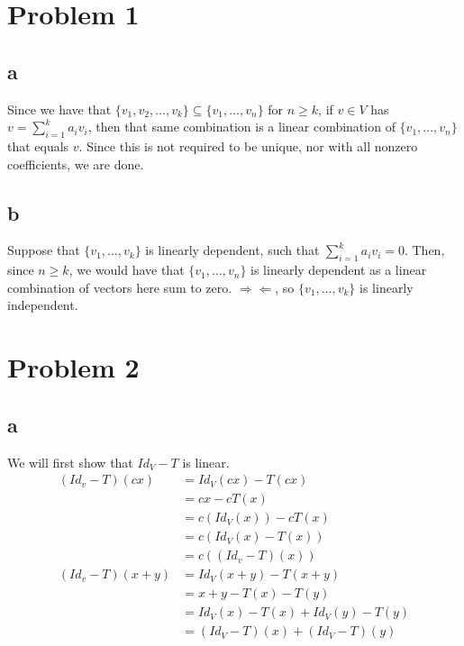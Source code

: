 \documentclass[12pt,letterpaper]{article}
\theoremstyle{definition}
\newcommand{\contra}{\Rightarrow\!\Leftarrow}
\begin{document}
\section*{Problem 1}

\subsection*{a}

Since we have that $\{v_1, v_2, ..., v_k\} \subseteq \{v_1, ..., v_n\}$ for $n
\geq k$, if $v \in V$ has $v = \sum_{i=1}^ka_iv_i$, then that same combination
is a linear combination of $\{v_1, ..., v_n\}$ that equals $v$. Since this is
not required to be unique, nor with all nonzero coefficients, we are done.

\subsection*{b}

Suppose that $\{v_1, ..., v_k\}$ is linearly dependent, such that
$\sum_{i=1}^ka_iv_i = 0$. Then, since $n \geq k$, we would have that $\{v_1,
..., v_n\}$ is linearly dependent as a linear combination of vectors here sum to
zero. $\contra$, so $\{v_1, ..., v_k\}$ is linearly independent.


\section*{Problem 2}

\subsection*{a}

We will first show that $Id_V - T$ is linear.
\begin{align*}
  (Id_v-T)(cx) &= Id_V(cx) - T(cx) \\
               &= cx - cT(x) \\
               &= c(Id_V(x)) - cT(x) \\
               &= c(Id_V(x) - T(x)) \\
               &= c((Id_v - T)(x)) \\
  (Id_v - T)(x + y) &= Id_V(x + y) - T(x + y) \\
               &= x + y - T(x) - T(y) \\
               &= Id_V(x) - T(x) + Id_V(y) - T(y) \\
               &= (Id_V - T)(x) + (Id_V - T)(y)
\end{align*}
\end{document}

